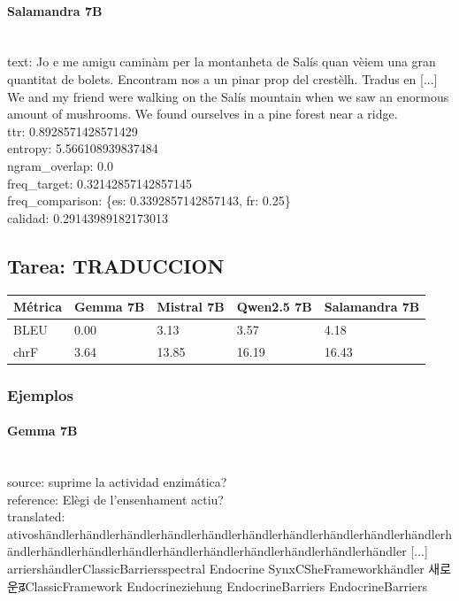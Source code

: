 \paragraph{Salamandra 7B}~\\
{text:} Jo e me amigu caminàm per la montanheta de Salís quan vèiem una gran quantitat de bolets. Encontram nos a un pinar prop del crestèlh.   Tradus en  [...] We and my friend were walking on the Salís mountain when we saw an enormous amount of mushrooms. We found ourselves in a pine forest near a ridge.\\
{ttr:} 0.8928571428571429\\
{entropy:} 5.566108939837484\\
{ngram\_overlap:} 0.0\\
{freq\_target:} 0.32142857142857145\\
{freq\_comparison:} \{\textquotesingle{}es\textquotesingle{}: 0.3392857142857143, \textquotesingle{}fr\textquotesingle{}: 0.25\}\\
{calidad:} 0.29143989182173013\\

\subsection{Tarea: TRADUCCION}\label{tarea-traduccion}
{\def\LTcaptype{none}
\begin{longtable}[]{@{}lllll@{}}
\toprule\noalign{}
Métrica & Gemma 7B & Mistral 7B & Qwen2.5 7B & Salamandra 7B \\
\midrule\noalign{}
\endhead
\bottomrule\noalign{}
\endlastfoot
BLEU & 0.00 & 3.13 & 3.57 & 4.18 \\
chrF & 3.64 & 13.85 & 16.19 & 16.43 \\
\end{longtable}}

\subsubsection{Ejemplos}

\paragraph{Gemma 7B}~\\
{source:} suprime la actividad enzimática?\\
{reference:} Elègi de l’ensenhament actiu?\\
{translated:} ativoshändlerhändlerhändlerhändlerhändlerhändlerhändlerhändlerhändlerhändlerhändlerhändlerhändlerhändlerhändlerhändlerhändlerhändlerhändlerhändler [...] arriershändlerClassicBarriersspectral Endocrine SynxCSheFrameworkhändler 새로운ढ़ClassicFramework Endocrineziehung EndocrineBarriers EndocrineBarriers\\

